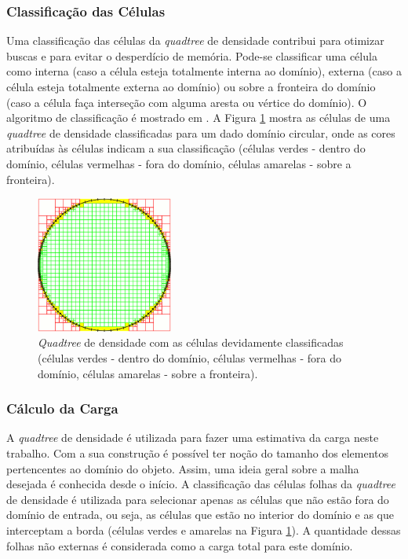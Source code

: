 \subsubsection{Classificação das Células}

Uma classificação das células da \textit{quadtree} de densidade contribui para otimizar buscas e para evitar o desperdício de memória. Pode-se classificar uma célula como interna (caso a célula esteja totalmente interna ao domínio), externa (caso a célula esteja totalmente externa ao domínio) ou sobre a fronteira do domínio (caso a célula faça interseção com alguma aresta ou vértice do domínio). O algoritmo de classificação é mostrado em \cite{bib:Freitas10}. A Figura \ref{fig:classificacao} mostra as células de uma \textit{quadtree} de densidade classificadas para um dado domínio circular, onde as cores atribuídas às células indicam a sua classificação (células verdes - dentro do domínio, células vermelhas - fora do domínio, células amarelas - sobre a fronteira).

\begin{figure}[!ht]
	\centering
	\includegraphics[width=0.4\textwidth]{fig/classificacao.png}
	\caption{\textit{Quadtree} de densidade com as células devidamente classificadas (células verdes - dentro do domínio, células vermelhas - fora do domínio, células amarelas - sobre a fronteira).}
	\label{fig:classificacao}
\end{figure}


\subsubsection{Cálculo da Carga}

A \textit{quadtree} de densidade é utilizada para fazer uma estimativa da carga neste trabalho. Com a sua construção é possível ter noção do tamanho dos elementos pertencentes ao domínio do objeto. Assim, uma ideia geral sobre a malha desejada é conhecida desde o início. A classificação das células folhas da \textit{quadtree} de densidade é utilizada para selecionar apenas as células que não estão fora do domínio de entrada, ou seja, as células que estão no interior do domínio e as que interceptam a borda (células verdes e amarelas na Figura \ref{fig:classificacao}). A quantidade dessas folhas não externas é considerada como a carga total para este domínio.

